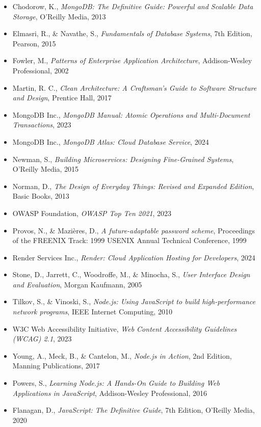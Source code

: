 \documentclass[12pt,a4paper]{report}
\begin{document}
\begin{itemize}
    \item Chodorow, K., \textit{MongoDB: The Definitive Guide: Powerful and Scalable Data Storage}, O'Reilly Media, 2013
    \item Elmasri, R., \& Navathe, S., \textit{Fundamentals of Database Systems}, 7th Edition, Pearson, 2015
    \item Fowler, M., \textit{Patterns of Enterprise Application Architecture}, Addison-Wesley Professional, 2002
    \item Martin, R. C., \textit{Clean Architecture: A Craftsman's Guide to Software Structure and Design}, Prentice Hall, 2017
    \item MongoDB Inc., \textit{MongoDB Manual: Atomic Operations and Multi-Document Transactions}, 2023
    \item MongoDB Inc., \textit{MongoDB Atlas: Cloud Database Service}, 2024
    \item Newman, S., \textit{Building Microservices: Designing Fine-Grained Systems}, O'Reilly Media, 2015
    \item Norman, D., \textit{The Design of Everyday Things: Revised and Expanded Edition}, Basic Books, 2013
    \item OWASP Foundation, \textit{OWASP Top Ten 2021}, 2023
    \item Provos, N., \& Mazières, D., \textit{A future-adaptable password scheme}, Proceedings of the FREENIX Track: 1999 USENIX Annual Technical Conference, 1999
    \item Render Services Inc., \textit{Render: Cloud Application Hosting for Developers}, 2024
    \item Stone, D., Jarrett, C., Woodroffe, M., \& Minocha, S., \textit{User Interface Design and Evaluation}, Morgan Kaufmann, 2005
    \item Tilkov, S., \& Vinoski, S., \textit{Node.js: Using JavaScript to build high-performance network programs}, IEEE Internet Computing, 2010
    \item W3C Web Accessibility Initiative, \textit{Web Content Accessibility Guidelines (WCAG) 2.1}, 2023
    \item Young, A., Meck, B., \& Cantelon, M., \textit{Node.js in Action}, 2nd Edition, Manning Publications, 2017
    \item Powers, S., \textit{Learning Node.js: A Hands-On Guide to Building Web Applications in JavaScript}, Addison-Wesley Professional, 2016
    \item Flanagan, D., \textit{JavaScript: The Definitive Guide}, 7th Edition, O'Reilly Media, 2020

\end{itemize}
\end{document}
